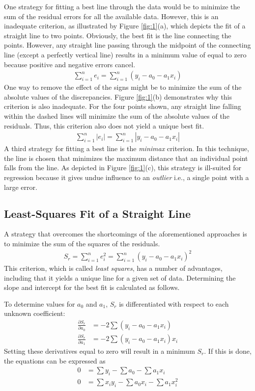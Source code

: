 \documentclass[book.tex]{subfiles}
\begin{document}
One strategy for fitting a best line through the data would be to minimize the sum of the
residual errors for all the available data. However, this is an inadequate criterion, as illustrated by Figure \ref{fig:1}(a), which depicts the fit of a straight line to two points. Obviously, the best fit is the line connecting the points. However, any straight line passing through the midpoint of the connecting line (except a perfectly vertical line) results in a minimum value of equal to zero because positive and negative errors cancel.
\begin{align}
\sum_{i=1}^{n}e_i = \sum_{i=1}^{n}(y_i - a_0 - a_1x_i)
\end{align}
One way to remove the effect of the signs might be to minimize the sum of the absolute
values of the discrepancies. Figure \ref{fig:1}(b) demonstrates why this criterion is also inadequate. For the four points shown, any straight line falling within the dashed lines will minimize the sum of the absolute values of the residuals. Thus, this criterion also does not yield a unique best fit.
\begin{align}
\sum_{i=1}^{n}|e_i| = \sum_{i=1}^{n}|y_i - a_0 - a_1x_i|
\end{align}
A third strategy for fitting a best line is the \textit{minimax} criterion. In this technique, the line is chosen that minimizes the maximum distance that an individual point falls from the line. As depicted in Figure \ref{fig:1}(c), this strategy is ill-suited for regression because it gives undue influence to an \textit{outlier} i.e., a single point with a large error.
\subsection{Least-Squares Fit of a Straight Line}
A strategy that overcomes the shortcomings of the aforementioned approaches is to minimize the sum of the squares of the residuals.
\begin{align}
S_r = \sum_{i=1}^{n}e_i^2 = \sum_{i=1}^{n}(y_i-a_0-a_1x_i)^2
\end{align}
This criterion, which is called \textit{least squares}, has a number of advantages, including that it yields a unique line for a given set of data.  Determining the slope and intercept for the best fit is calculated as follows.

To determine values for $a_0$ and $a_1$, $S_r$ is differentiated with respect to each unknown coefficient:
\begin{align}
\frac{\partial S_r}{\partial a_0}& = -2\sum(y_i-a_0-a_1x_i)\\
\frac{\partial S_r}{\partial a_1}&= -2\sum(y_i-a_0-a_1x_i)x_i
\end{align}
Setting these derivatives equal to zero will result in a minimum $S_r$. If this is done, the equations can be expressed as
\begin{align}
0 &= \sum y_i-\sum a_0- \sum a_1x_i\\
0 &= \sum x_iy_i-\sum a_0x_i- \sum a_1x_i^2
\end{align}
\end{document}

